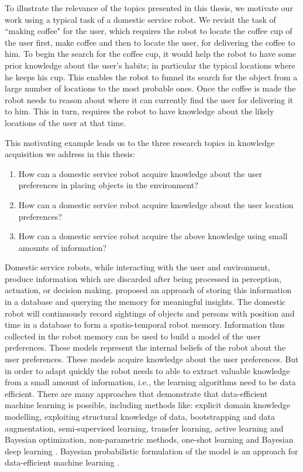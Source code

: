 To illustrate the relevance of the topics presented in this thesis, we motivate our work using a typical task of a domestic service robot.   We revisit the task of ``making coffee" for the user, which requires the robot to locate the coffee cup of the user first, make coffee and then to locate the user, for delivering the coffee to him. To begin the search for the coffee cup, it would help the robot to have some prior knowledge about the user's habits; in particular the typical locations where he keeps his cup. This enables the robot to funnel its search for the object from a large number of locations to the most probable ones. Once the coffee is made the robot needs to reason about where it can currently find the user for delivering it to him. This in turn, requires the robot to have knowledge about the likely locations of the user at that time.



This motivating example leads us to the three research topics in knowledge acquisition we address in this thesis:
\begin{enumerate}
	\item How can a domestic service robot acquire knowledge about the user preferences in placing objects in the environment?
	\item How can a domestic service robot acquire knowledge about the user location preferences?
	\item How can a domestic service robot acquire the above knowledge using small amounts of information?
\end{enumerate}


Domestic service robots, while interacting with the user and environment, produce information which are discarded after being processed in perception, actuation, or decision making. \cite{niemueller2012generic} proposed an approach of storing this information in a database and querying the memory for meaningful insights. 
The domestic robot will continuously record sightings of objects and persons with position and time in a database to form a spatio-temporal robot memory.
Information thus collected in the robot memory can be used to build a model of the user preferences. These models represent the internal beliefs of the robot about the user preferences. These models acquire knowledge about the user preferences. But in order to adapt quickly the robot needs to able to extract valuable knowledge from a small amount of information, i.e., the learning algorithms need to be data efficient. There are many approaches that demonstrate that data-efficient machine learning is possible, including methods like: explicit domain knowledge modelling, exploiting structural knowledge of data, bootstrapping and data augmentation, semi-supervised learning, transfer learning, active learning and Bayesian optimization, non-parametric methods, one-shot learning and Bayesian deep learning \citep{MarcICML2016}. Bayesian probabilistic formulation of the model is an approach for data-efficient machine learning \cite{Bishop20120222}.


